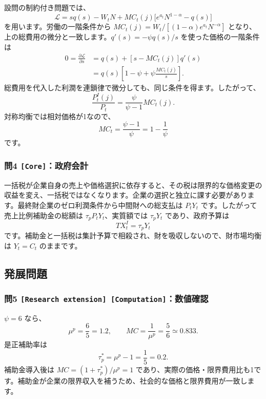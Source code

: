 \documentclass[
  japanese,
  lualatex,
  ja=standard,
  11pt,
  a4paper]{ltjsarticle}
\begin{document}
設問の制約付き問題では、 \[
\mathcal L
=sq(s)-W_tN
+MC_t(j)\bigl[e^{a_t}N^{1-\alpha}-q(s)\bigr]
\] を用います。労働の一階条件から
\(MC_t(j)=W_t/[(1-\alpha)e^{a_t}N^{-\alpha}]\)
となり、上の総費用の微分と一致します。\(q'(s)=-\psi q(s)/s\)
を使った価格の一階条件は \[
\begin{aligned}
0=\frac{\partial\mathcal L}{\partial s}
&=q(s)+[s-MC_t(j)]q'(s)\\
&=q(s)\left[1-\psi+\psi\frac{MC_t(j)}s\right].
\end{aligned}
\]
総費用を代入した利潤を連鎖律で微分しても、同じ条件を得ます。したがって、
\[
\frac{P_t^I(j)}{P_t}
=\frac{\psi}{\psi-1}MC_t(j).
\] 対称均衡では相対価格が1なので、 \[
MC_t=\frac{\psi-1}{\psi}=1-\frac1\psi
\] です。

\subsubsection{\texorpdfstring{問4
\texttt{{[}Core{]}}：政府会計}{問4 {[}Core{]}：政府会計}}\label{ux554f4-coreux653fux5e9cux4f1aux8a08}

一括税が企業自身の売上や価格選択に依存すると、その税は限界的な価格変更の収益を変え、一括税ではなくなります。企業の選択と独立に課す必要があります。最終財企業のゼロ利潤条件から中間財への総支払は
\(P_tY_t\) です。したがって売上比例補助金の総額は
\(\tau_pP_tY_t\)、実質額では \(\tau_pY_t\) であり、政府予算は \[
TX_t^I=\tau_pY_t
\]
です。補助金と一括税は集計予算で相殺され、財を吸収しないので、財市場均衡は
\(Y_t=C_t\) のままです。

\subsection{発展問題}\label{ux767aux5c55ux554fux984c-5}

\subsubsection{\texorpdfstring{問5
\texttt{{[}Research\ extension{]}\ {[}Computation{]}}：数値確認}{問5 {[}Research extension{]} {[}Computation{]}：数値確認}}\label{ux554f5-research-extension-computationux6570ux5024ux78baux8a8d}

\(\psi=6\) なら、 \[
\mu^p=\frac65=1.2,
\qquad
MC=\frac1{\mu^p}=\frac56\simeq0.833.
\] 是正補助率は \[
\tau_p^*=\mu^p-1=\frac15=0.2.
\] 補助金導入後は \(MC=(1+\tau_p^*)/\mu^p=1\)
であり、実際の価格・限界費用比も1です。補助金が企業の限界収入を補うため、社会的な価格と限界費用が一致します。
\end{document}
